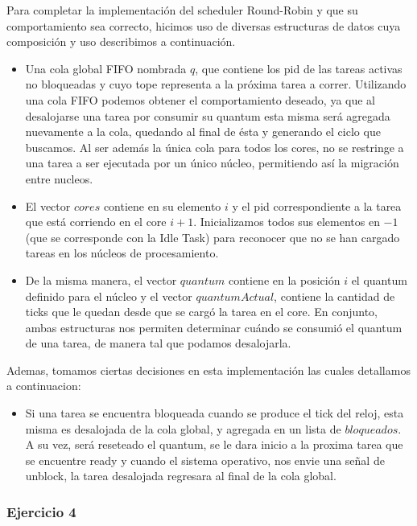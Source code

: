 \indent \indent Para completar la implementación del scheduler Round-Robin y que su comportamiento sea correcto, hicimos uso de diversas estructuras de datos cuya composición y uso describimos a continuación.\\
\begin{itemize}
\item Una cola global FIFO nombrada $q$, que contiene los pid de las tareas activas no bloqueadas y cuyo tope representa a la próxima tarea a correr. 
Utilizando una cola FIFO podemos obtener el comportamiento deseado, ya  que al desalojarse una tarea por consumir su quantum esta misma será agregada nuevamente a la cola, quedando al final de ésta y generando el ciclo que buscamos.
Al ser además la única cola para todos los cores, no se restringe a una tarea a ser ejecutada por un único núcleo, permitiendo así la migración entre nucleos.\\
\item El vector $cores$ contiene en su elemento $i$ y el pid correspondiente a la tarea que está corriendo en el core $i+1$. Inicializamos todos sus elementos en $-1$ (que se corresponde con la Idle Task) para reconocer que no se han cargado tareas en los núcleos de procesamiento.\\
\item De la misma manera, el vector $quantum$ contiene en la posición $i$ el quantum definido para el núcleo y el vector $quantumActual$, contiene la cantidad de ticks que le quedan desde que se cargó la tarea en el core. 
En conjunto, ambas estructuras nos permiten determinar cuándo se consumió el quantum de una tarea, de manera tal que podamos desalojarla.\\
\end{itemize}
\indent Ademas, tomamos ciertas decisiones en esta implementación las cuales detallamos a continuacion:
\begin{itemize}
 \item Si una tarea se encuentra bloqueada cuando se produce el tick del reloj, esta misma es desalojada de la cola global, 
 y agregada en un lista de $bloqueados$. A su vez, será reseteado el quantum, se le dara inicio a la proxima tarea que se encuentre
 ready y cuando el sistema operativo, nos envie una señal de unblock, la tarea desalojada regresara al final de la cola global.
\end{itemize}


\subsubsection[Resolución Ejercicio 4]{Ejercicio 4}


